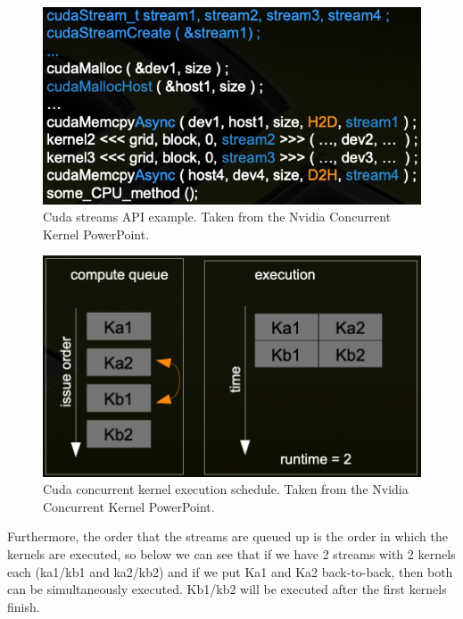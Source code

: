 \documentclass[sigconf]{acmart}
\begin{document}
\begin{figure}[h]
  \centering
  \includegraphics[width=\linewidth]{img/image1}
  \caption{Cuda streams API example. Taken from the Nvidia Concurrent Kernel PowerPoint. \cite{nvidia_concurrent}}
\end{figure}

\begin{figure}[h]
  \centering
  \includegraphics[width=\linewidth]{img/image6}
  \caption{Cuda concurrent kernel execution schedule. Taken from the Nvidia Concurrent Kernel PowerPoint. \cite{nvidia_concurrent}}
\end{figure}

Furthermore, the order that the streams are queued up is the order in which the kernels are executed, so below we can see that if we have 2 streams with 2 kernels each (ka1/kb1 and ka2/kb2) and if we put Ka1 and Ka2 back-to-back, then both can be simultaneously executed. Kb1/kb2 will be executed after the first kernels finish. 
\end{document}
